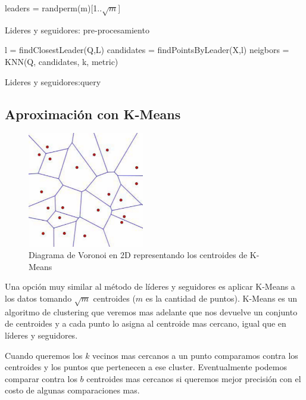\begin{algorithm}[]
  leaders = randperm(m)[1..$\sqrt{m}$]\;
 \caption{Lideres y seguidores: pre-procesamiento}
\end{algorithm}

\begin{algorithm}[]
 l = findClosestLeader(Q,L)\;
candidates = findPointsByLeader(X,l)\;
neigbors = KNN(Q, candidates, k, metric)\;
 \caption{Lideres y seguidores:query}
\end{algorithm}

\subsection{Aproximación con K-Means}

\begin{figure}[!htb]
\centering
\includegraphics[width=2in]{figures/vorono-fig-1.png}

\caption{Diagrama de Voronoi en 2D representando los centroides de K-Means}
\label{fig:vorono}
\end{figure}

Una opción muy similar al método de líderes y seguidores es aplicar K-Means a los datos tomando $\sqrt{m}$ centroides ($m$ es la cantidad de puntos). K-Means es un algoritmo de clustering que veremos mas adelante que nos devuelve un conjunto de centroides y a cada punto lo asigna al centroide mas cercano, igual que en líderes y seguidores. 

Cuando queremos los $k$ vecinos mas cercanos a un punto comparamos contra los centroides y los puntos que pertenecen a ese cluster. Eventualmente podemos comparar contra los $b$ centroides mas cercanos si queremos mejor precisión con el costo de algunas comparaciones mas.

